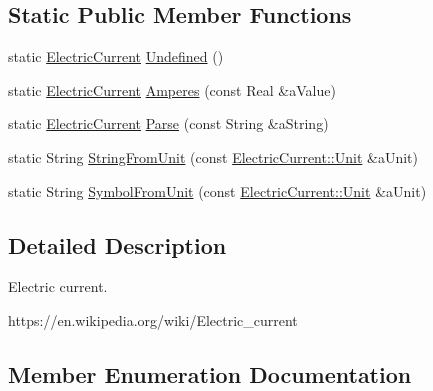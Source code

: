 \subsection*{Static Public Member Functions}
\begin{DoxyCompactItemize}
\item 
static \hyperlink{classlibrary_1_1physics_1_1units_1_1_electric_current}{Electric\+Current} \hyperlink{classlibrary_1_1physics_1_1units_1_1_electric_current_ae7de29cf2987692918a092a9fcbf209f}{Undefined} ()
\item 
static \hyperlink{classlibrary_1_1physics_1_1units_1_1_electric_current}{Electric\+Current} \hyperlink{classlibrary_1_1physics_1_1units_1_1_electric_current_a0ae1e07beb6c4dfcfa901714ff4dcb75}{Amperes} (const Real \&a\+Value)
\item 
static \hyperlink{classlibrary_1_1physics_1_1units_1_1_electric_current}{Electric\+Current} \hyperlink{classlibrary_1_1physics_1_1units_1_1_electric_current_acf532c6c33b8c8e580e062aa4d15b069}{Parse} (const String \&a\+String)
\item 
static String \hyperlink{classlibrary_1_1physics_1_1units_1_1_electric_current_adfc04e139353ede136d9dd4e0e256222}{String\+From\+Unit} (const \hyperlink{classlibrary_1_1physics_1_1units_1_1_electric_current_a9498eabf964f0ae6116eb627b4ec5233}{Electric\+Current\+::\+Unit} \&a\+Unit)
\item 
static String \hyperlink{classlibrary_1_1physics_1_1units_1_1_electric_current_a3caf9ff55162e8cec82de2cf654574d2}{Symbol\+From\+Unit} (const \hyperlink{classlibrary_1_1physics_1_1units_1_1_electric_current_a9498eabf964f0ae6116eb627b4ec5233}{Electric\+Current\+::\+Unit} \&a\+Unit)
\end{DoxyCompactItemize}


\subsection{Detailed Description}
Electric current. 

https\+://en.wikipedia.\+org/wiki/\+Electric\+\_\+current 

\subsection{Member Enumeration Documentation}
\mbox{\label{classlibrary_1_1physics_1_1units_1_1_electric_current_a9498eabf964f0ae6116eb627b4ec5233}} 
